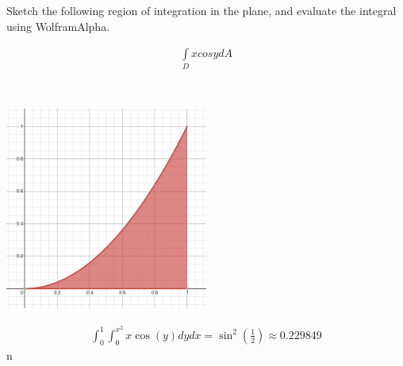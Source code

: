 Sketch the following region of integration in the plane, and evaluate the integral using WolframAlpha.

\begin{align*}
    \int\limits_{D} x cos y dA
\end{align*}

\begin{solution} \
    \begin{center}
        \includegraphics[width=0.5\textwidth]{img/e4p1.png}
    \end{center}
    
    \begin{align*}
        \int_{0}^{1} \int_{0}^{x^{2}} x \cos (y) d y d x=\sin ^{2}\left(\frac{1}{2}\right) \approx 0.229849
    \end{align*}n
\end{solution}